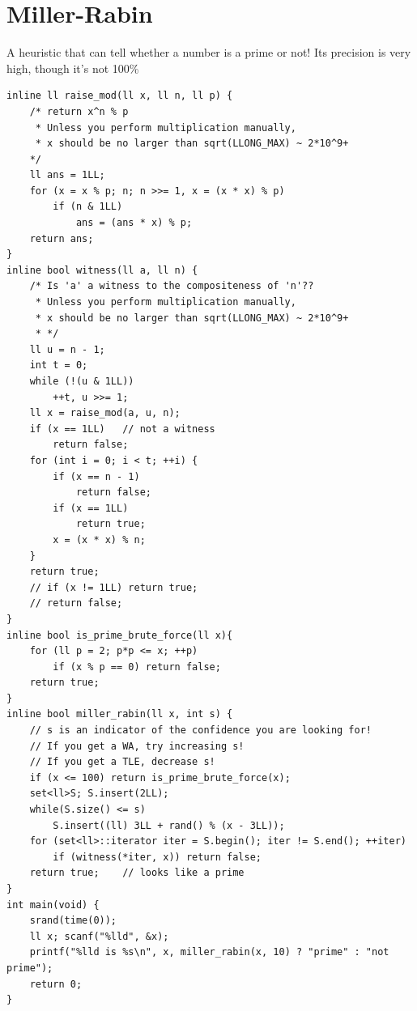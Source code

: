 \documentclass[12pt]{book}
\begin{document}
\section{Miller-Rabin}
A heuristic that can tell whether a number is a prime or not!
Its precision is very high, though it's not 100\%
\begin{verbatim}
inline ll raise_mod(ll x, ll n, ll p) {
	/* return x^n % p
	 * Unless you perform multiplication manually,
	 * x should be no larger than sqrt(LLONG_MAX) ~ 2*10^9+
	*/
	ll ans = 1LL;
	for (x = x % p; n; n >>= 1, x = (x * x) % p)
		if (n & 1LL)
			ans = (ans * x) % p;
	return ans;
}
inline bool witness(ll a, ll n) {
	/* Is 'a' a witness to the compositeness of 'n'??
	 * Unless you perform multiplication manually,
	 * x should be no larger than sqrt(LLONG_MAX) ~ 2*10^9+
	 * */
	ll u = n - 1;
	int t = 0;
	while (!(u & 1LL))
		++t, u >>= 1;
	ll x = raise_mod(a, u, n);
	if (x == 1LL)	// not a witness
		return false;
	for (int i = 0; i < t; ++i) {
		if (x == n - 1)
			return false;
		if (x == 1LL)
			return true;
		x = (x * x) % n;
	}
	return true;
	// if (x != 1LL) return true;
	// return false;
}
inline bool is_prime_brute_force(ll x){
	for (ll p = 2; p*p <= x; ++p)
		if (x % p == 0) return false;
	return true;
}
inline bool miller_rabin(ll x, int s) {
	// s is an indicator of the confidence you are looking for!
	// If you get a WA, try increasing s!
	// If you get a TLE, decrease s!
	if (x <= 100) return is_prime_brute_force(x);
	set<ll>S; S.insert(2LL);
	while(S.size() <= s)
		S.insert((ll) 3LL + rand() % (x - 3LL));
	for (set<ll>::iterator iter = S.begin(); iter != S.end(); ++iter)
		if (witness(*iter, x)) return false;
	return true;	// looks like a prime
}
int main(void) {
	srand(time(0));
	ll x; scanf("%lld", &x);
	printf("%lld is %s\n", x, miller_rabin(x, 10) ? "prime" : "not prime");
	return 0;
}
\end{verbatim}
\end{document}

